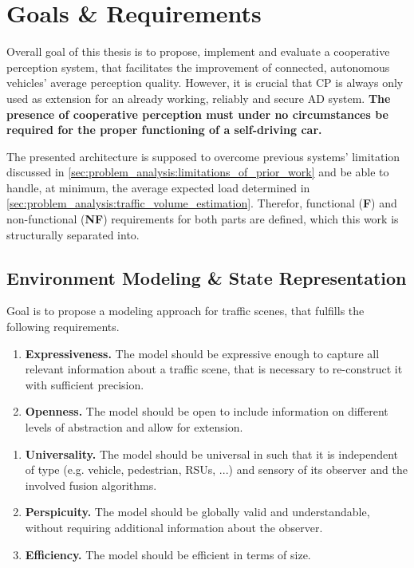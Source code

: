 \section{Goals \& Requirements}
\label{sec:problem_analysis:goals_requirements}
Overall goal of this thesis is to propose, implement and evaluate a cooperative perception system, that facilitates the improvement of connected, autonomous vehicles' average perception quality. However, it is crucial that CP is always only used as extension for an already working, reliably and secure AD system. \textbf{The presence of cooperative perception must under no circumstances be required for the proper functioning of a self-driving car.}

The presented architecture is supposed to overcome previous systems' limitation discussed in \cref{sec:problem_analysis:limitations_of_prior_work} and be able to handle, at minimum, the average expected load determined in \cref{sec:problem_analysis:traffic_volume_estimation}. Therefor, functional (\textbf{F}) and non-functional (\textbf{NF}) requirements for both parts are defined, which this work is structurally separated into.

\subsection{Environment Modeling \& State Representation}
\label{subsec:problem_analysis:environment_modeling_state_representation}

Goal is to propose a modeling approach for traffic scenes, that fulfills the following requirements. 

\begin{enumerate}[F-M1:\ \ ]
	\item \textbf{Expressiveness.} The model should be expressive enough to capture all relevant information about a traffic scene, that is necessary to re-construct it with sufficient precision.
	\item \textbf{Openness.} The model should be open to include information on different levels of abstraction and allow for extension.
\end{enumerate}
\begin{enumerate}[NF-M1:]
	\item \textbf{Universality.} The model should be universal in such that it is independent of type (e.g. vehicle, pedestrian, RSUs, ...) and sensory of its observer and the involved fusion algorithms.
	\item \textbf{Perspicuity.} The model should be globally valid and understandable, without requiring additional information about the observer.
	\item \textbf{Efficiency.} The model should be efficient in terms of size.
\end{enumerate}

